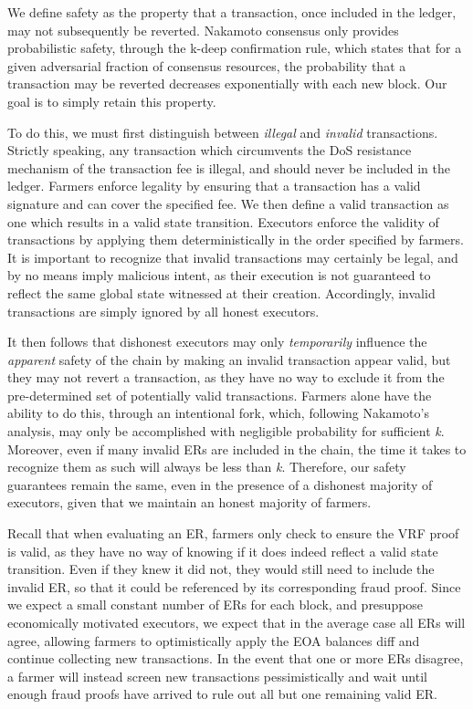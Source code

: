 \documentclass[conference]{IEEEtran}
\begin{document}
We define safety as the property that a transaction, once included in the ledger, may not subsequently be reverted. Nakamoto consensus only provides probabilistic safety, through the k-deep confirmation rule, which states that for a given adversarial fraction of consensus resources, the probability that a transaction may be reverted decreases exponentially with each new block. Our goal is to simply retain this property. 

To do this, we must first distinguish between \textit{illegal} and \textit{invalid} transactions. Strictly speaking, any transaction which circumvents the DoS resistance mechanism of the transaction fee is illegal, and should never be included in the ledger. Farmers enforce legality by ensuring that a transaction has a valid signature and can cover the specified fee. We then define a valid transaction as one which results in a valid state transition. Executors enforce the validity of transactions by applying them deterministically in the order specified by farmers. It is important to recognize that invalid transactions may certainly be legal, and by no means imply malicious intent, as their execution is not guaranteed to reflect the same global state witnessed at their creation. Accordingly, invalid transactions are simply ignored by all honest executors. 

It then follows that dishonest executors may only \textit{temporarily} influence the \textit{apparent} safety of the chain by making an invalid transaction appear valid, but they may not revert a transaction, as they have no way to exclude it from the pre-determined set of potentially valid transactions. Farmers alone have the ability to do this, through an intentional fork, which, following Nakamoto’s analysis, may only be accomplished with negligible probability for sufficient \textit{k}\cite{bitcoin}. Moreover, even if many invalid ERs are included in the chain, the time it takes to recognize them as such will always be less than \textit{k}. Therefore, our safety guarantees remain the same, even in the presence of a dishonest majority of executors, given that we maintain an honest majority of farmers. 

Recall that when evaluating an ER, farmers only check to ensure the VRF proof is valid, as they have no way of knowing if it does indeed reflect a valid state transition. Even if they knew it did not, they would still need to include the invalid ER, so that it could be referenced by its corresponding fraud proof. Since we expect a small constant number of ERs for each block, and presuppose economically motivated executors, we expect that in the average case all ERs will agree, allowing farmers to optimistically apply the EOA balances diff and continue collecting new transactions. In the event that one or more ERs disagree, a farmer will instead screen new transactions pessimistically and wait until enough fraud proofs have arrived to rule out all but one remaining valid ER. 
\end{document}
